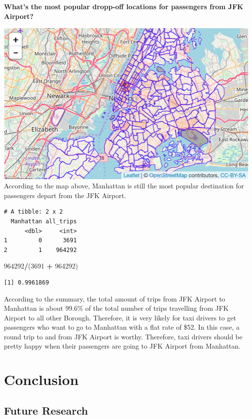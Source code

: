 \documentclass[12pt,twoside]{reedthesis}
\newenvironment{Shaded}{\begin{snugshade}}{\end{snugshade}}
\newcommand{\DecValTok}[1]{\textcolor[rgb]{0.00,0.00,0.81}{#1}}
\newcommand{\StringTok}[1]{\textcolor[rgb]{0.31,0.60,0.02}{#1}}
\newcommand{\OperatorTok}[1]{\textcolor[rgb]{0.81,0.36,0.00}{\textbf{#1}}}
\newcommand{\NormalTok}[1]{#1}
\theoremstyle{definition}
\theoremstyle{definition}
\theoremstyle{definition}
\theoremstyle{remark}
\begin{document}
\textbf{What's the most popular dropp-off locations for passengers from
JFK Airport? }

\includegraphics{figure/from_jkf_num.png} According to the map above,
Manhattan is still the most popular destination for passengers depart
from the JFK Airport.
\begin{verbatim}
# A tibble: 2 x 2
  Manhattan all_trips
      <dbl>     <int>
1         0      3691
2         1    964292
\end{verbatim}
\begin{Shaded}
\begin{Highlighting}[]
\DecValTok{964292}\OperatorTok{/}\NormalTok{(}\DecValTok{3691} \OperatorTok{+}\StringTok{ }\DecValTok{964292}\NormalTok{)}
\end{Highlighting}
\end{Shaded}
\begin{verbatim}
[1] 0.9961869
\end{verbatim}
According to the summary, the total amount of trips from JFK Airport to
Manhattan is about 99.6\% of the total number of trips travelling from
JFK Airport to all other Borough. Therefore, it is very likely for taxi
drivers to get passengers who want to go to Manhattan with a flat rate
of \$52. In this case, a round trip to and from JFK Airport is worthy.
Therefore, taxi drivers should be pretty happy when their passengers are
going to JFK Airport from Manhattan.

\chapter{Conclusion}\label{chapter5}

\section{Future Research}\label{future-research}
\end{document}
